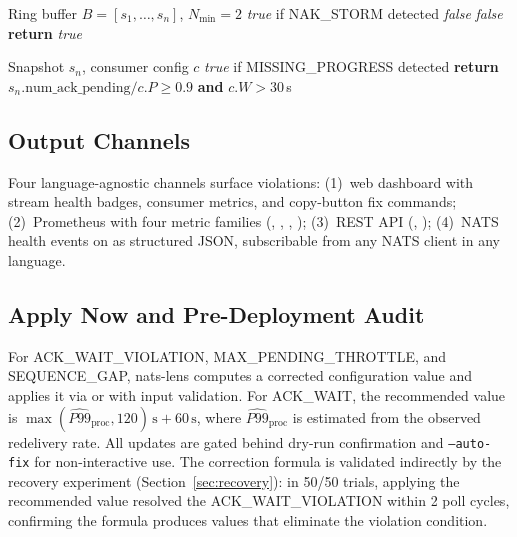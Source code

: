 \documentclass[journal]{IEEEtran}
\begin{document}
\begin{algorithm}[t]
\caption{NAK\_STORM Detector}
\label{alg:nak}
\begin{algorithmic}[1]
\Require Ring buffer $B = [s_1, \ldots, s_n]$, $N_\text{min} = 2$
\Ensure \textit{true} if NAK\_STORM detected
 \Return \textit{false} \EndIf
{}
    \Return \textit{false}
  \EndIf
\EndFor
\State \textbf{return} \textit{true}
\end{algorithmic}
\end{algorithm}

\begin{algorithm}[t]
\caption{MISSING\_PROGRESS Detector}
\label{alg:missing}
\begin{algorithmic}[1]
\Require Snapshot $s_n$, consumer config $c$
\Ensure \textit{true} if MISSING\_PROGRESS detected
\State \textbf{return} $s_n.\text{num\_ack\_pending} / c.P \geq 0.9$
        \textbf{and} $c.W > 30$\,s
\end{algorithmic}
\end{algorithm}

\subsection{Output Channels}

Four language-agnostic channels surface violations:
(1)~web dashboard with stream health badges, consumer metrics, and
copy-button fix commands;
(2)~Prometheus  with four metric families
(, ,
, );
(3)~REST API (, );
(4)~NATS health events on
as structured JSON, subscribable from any NATS client in any language.

\subsection{Apply Now and Pre-Deployment Audit}

For ACK\_WAIT\_VIOLATION, MAX\_PENDING\_THROTTLE, and SEQUENCE\_GAP,
nats-lens computes a corrected configuration value and applies it via
 or  with
input validation. For ACK\_WAIT, the recommended value is
$\max(\hat{P99}_\text{proc}, 120)\,\text{s} + 60\,\text{s}$, where
$\hat{P99}_\text{proc}$ is estimated from the observed redelivery rate.
All updates are gated behind dry-run confirmation and \texttt{--auto-fix}
for non-interactive use.
The correction formula is validated indirectly by the recovery experiment
(Section~\ref{sec:recovery}): in 50/50 trials, applying the recommended
 value resolved the ACK\_WAIT\_VIOLATION within 2 poll
cycles, confirming the formula produces values that eliminate the
violation condition.
\end{document}
